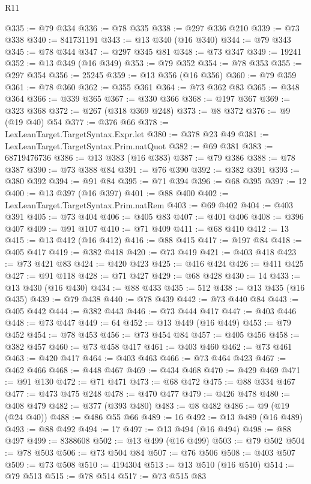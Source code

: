 \begin{lexlean}{R11}
\begin{coremodule}
@335 := @79 @334
@336 := @78 @335
@338 := @297 @336 @210
@339 := @73 @338
@340 := 841731191
@343 := @13 @340 (@16 @340)
@344 := @79 @343
@345 := @78 @344
@347 := @297 @345 @81
@348 := @73 @347
@349 := 19241
@352 := @13 @349 (@16 @349)
@353 := @79 @352
@354 := @78 @353
@355 := @297 @354
@356 := 25245
@359 := @13 @356 (@16 @356)
@360 := @79 @359
@361 := @78 @360
@362 := @355 @361
@364 := @73 @362 @83
@365 := @348 @364
@366 := @339 @365
@367 := @330 @366
@368 := @197 @367
@369 := @323 @368
@372 := @267 (@318 @369 @248)
@373 := @8 @372
@376 := @9 (@19 @40) @54
@377 := @376 @66
@378 := LexLeanTarget.TargetSyntax.Expr.let
@380 := @378 @23 @49
@381 := LexLeanTarget.TargetSyntax.Prim.natQuot
@382 := @69 @381
@383 := 68719476736
@386 := @13 @383 (@16 @383)
@387 := @79 @386
@388 := @78 @387
@390 := @73 @388 @84
@391 := @76 @390
@392 := @382 @391
@393 := @380 @392
@394 := @91 @84
@395 := @71 @394
@396 := @68 @395
@397 := 12
@400 := @13 @397 (@16 @397)
@401 := @88 @400
@402 := LexLeanTarget.TargetSyntax.Prim.natRem
@403 := @69 @402
@404 := @403 @391
@405 := @73 @404
@406 := @405 @83
@407 := @401 @406
@408 := @396 @407
@409 := @91 @107
@410 := @71 @409
@411 := @68 @410
@412 := 13
@415 := @13 @412 (@16 @412)
@416 := @88 @415
@417 := @197 @84
@418 := @405 @417
@419 := @382 @418
@420 := @73 @419
@421 := @403 @418
@423 := @73 @421 @83
@424 := @420 @423
@425 := @416 @424
@426 := @411 @425
@427 := @91 @118
@428 := @71 @427
@429 := @68 @428
@430 := 14
@433 := @13 @430 (@16 @430)
@434 := @88 @433
@435 := 512
@438 := @13 @435 (@16 @435)
@439 := @79 @438
@440 := @78 @439
@442 := @73 @440 @84
@443 := @405 @442
@444 := @382 @443
@446 := @73 @444 @417
@447 := @403 @446
@448 := @73 @447
@449 := 64
@452 := @13 @449 (@16 @449)
@453 := @79 @452
@454 := @78 @453
@456 := @73 @454 @84
@457 := @405 @456
@458 := @382 @457
@460 := @73 @458 @417
@461 := @403 @460
@462 := @73 @461
@463 := @420 @417
@464 := @403 @463
@466 := @73 @464 @423
@467 := @462 @466
@468 := @448 @467
@469 := @434 @468
@470 := @429 @469
@471 := @91 @130
@472 := @71 @471
@473 := @68 @472
@475 := @88 @334 @467
@477 := @473 @475 @248
@478 := @470 @477
@479 := @426 @478
@480 := @408 @479
@482 := @377 (@393 @480)
@483 := @8 @482
@486 := @9 (@19 (@24 @40))
@488 := @486 @55 @66
@489 := 16
@492 := @13 @489 (@16 @489)
@493 := @88 @492
@494 := 17
@497 := @13 @494 (@16 @494)
@498 := @88 @497
@499 := 8388608
@502 := @13 @499 (@16 @499)
@503 := @79 @502
@504 := @78 @503
@506 := @73 @504 @84
@507 := @76 @506
@508 := @403 @507
@509 := @73 @508
@510 := 4194304
@513 := @13 @510 (@16 @510)
@514 := @79 @513
@515 := @78 @514
@517 := @73 @515 @83

\end{coremodule}
\end{lexlean}
